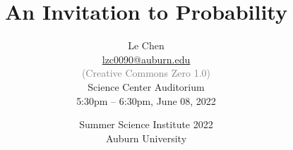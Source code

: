 


\title %
{
  An Invitation to Probability
}


\author{
  Le Chen\\
  {\small\url{lzc0090@auburn.edu}}\\[1em]
  \textcolor{gray}{\small (Creative Commons Zero 1.0)} \\[3em]
  {\small Science Center Auditorium}\\[1em]
  {\small 5:30pm -- 6:30pm, June 08, 2022}
}



\date[Auburn]{
  Summer Science Institute 2022\\
  Auburn University
}



